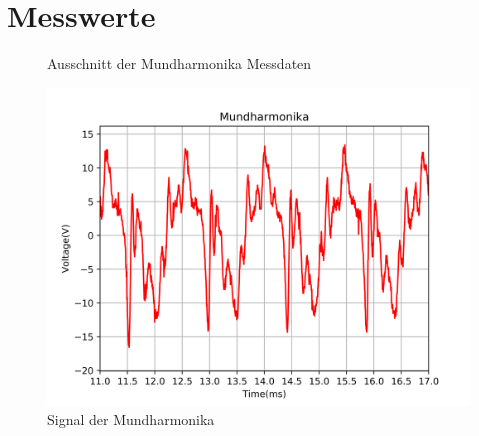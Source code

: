 \documentclass[12pt, oneside, a4paper, \docLanguage]{report}
\begin{document}
\section{Messwerte}
\label{chap:VERSUCH_1_MESSWERTE}
\begin{figure}[H]
\centering
{}
\caption{Ausschnitt der Mundharmonika Messdaten}
\end{figure}
\pagebreak
\begin{figure}[H]
\includegraphics[width=1\textwidth]{../MundSignal.png}
\caption{Signal der Mundharmonika}
\end{figure}
	
\end{document}
